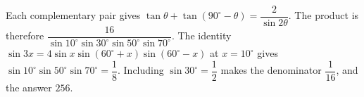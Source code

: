 Each complementary pair gives $\tan\theta+\tan(90^\circ-\theta)=\dfrac{2}{\sin2\theta}$. The product is therefore $\dfrac{16}{\sin10^\circ\sin30^\circ\sin50^\circ\sin70^\circ}$. The identity $\sin3x=4\sin x\sin(60^\circ+x)\sin(60^\circ-x)$ at $x=10^\circ$ gives $\sin10^\circ\sin50^\circ\sin70^\circ=\dfrac{1}{8}$. Including $\sin30^\circ=\dfrac{1}{2}$ makes the denominator $\dfrac{1}{16}$, and the answer $\boxed{256}$.
